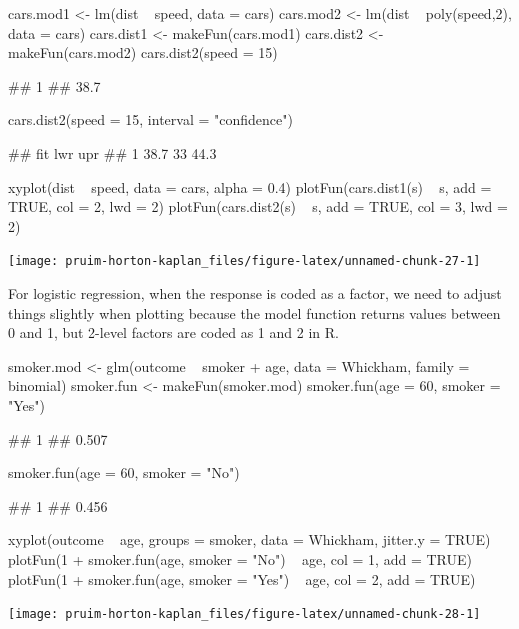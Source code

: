 \begin{Schunk}
\begin{Sinput}
cars.mod1 <- lm(dist ~ speed, data = cars)
cars.mod2 <- lm(dist ~ poly(speed,2), data = cars)
cars.dist1 <- makeFun(cars.mod1)
cars.dist2 <- makeFun(cars.mod2)
cars.dist2(speed = 15)
\end{Sinput}
\begin{Soutput}
##    1 
## 38.7
\end{Soutput}
\begin{Sinput}
cars.dist2(speed = 15, interval = "confidence")
\end{Sinput}
\begin{Soutput}
##    fit lwr  upr
## 1 38.7  33 44.3
\end{Soutput}
\begin{Sinput}
xyplot(dist ~ speed, data = cars, alpha = 0.4)
plotFun(cars.dist1(s) ~ s, add = TRUE, col = 2, lwd = 2)
plotFun(cars.dist2(s) ~ s, add = TRUE, col = 3, lwd = 2)
\end{Sinput}


\begin{center}\texttt{[image: pruim-horton-kaplan\_files/figure-latex/unnamed-chunk-27-1]} \end{center}

\end{Schunk}

\noindent
For logistic regression, when the response is coded as a factor, we need
to adjust things slightly when plotting because the model function
returns values between 0 and 1, but 2-level factors are coded as 1 and 2
in R.

\begin{Schunk}
\begin{Sinput}
smoker.mod <- glm(outcome ~ smoker + age, data = Whickham, family = binomial)
smoker.fun <- makeFun(smoker.mod)
smoker.fun(age = 60, smoker = "Yes")
\end{Sinput}
\begin{Soutput}
##     1 
## 0.507
\end{Soutput}
\begin{Sinput}
smoker.fun(age = 60, smoker = "No")
\end{Sinput}
\begin{Soutput}
##     1 
## 0.456
\end{Soutput}
\begin{Sinput}
xyplot(outcome ~ age, groups = smoker, data = Whickham, jitter.y = TRUE)
plotFun(1 + smoker.fun(age, smoker = "No") ~ age, col = 1, add = TRUE)
plotFun(1 + smoker.fun(age, smoker = "Yes") ~ age, col = 2, add = TRUE)
\end{Sinput}


\begin{center}\texttt{[image: pruim-horton-kaplan\_files/figure-latex/unnamed-chunk-28-1]} \end{center}

\end{Schunk}


